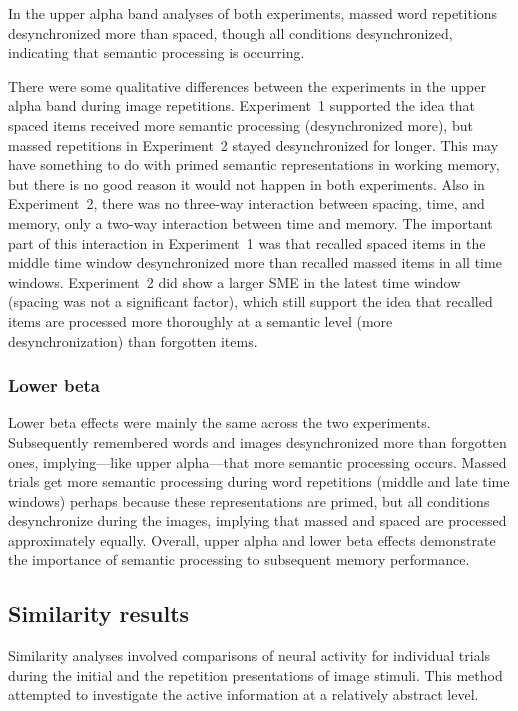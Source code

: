 In the upper alpha band analyses of both experiments, massed word repetitions desynchronized more than spaced, though all conditions desynchronized, indicating that semantic processing is occurring.

There were some qualitative differences between the experiments in the upper alpha band during image repetitions.  Experiment~1 supported the idea that spaced items received more semantic processing (desynchronized more), but massed repetitions in Experiment~2 stayed desynchronized for longer.  This may have something to do with primed semantic representations in working memory, but there is no good reason it would not happen in both experiments.  Also in Experiment~2, there was no three-way interaction between spacing, time, and memory, only a two-way interaction between time and memory.  The important part of this interaction in Experiment~1 was that recalled spaced items in the middle time window desynchronized more than recalled massed items in all time windows.  Experiment~2 did show a larger SME in the latest time window (spacing was not a significant factor), which still support the idea that recalled items are processed more thoroughly at a semantic level (more desynchronization) than forgotten items.



\subsubsection{Lower beta}

Lower beta effects were mainly the same across the two experiments.  Subsequently remembered words and images desynchronized more than forgotten ones, implying---like upper alpha---that more semantic processing occurs.
Massed trials get more semantic processing during word repetitions (middle and late time windows) perhaps because these representations are primed, but all conditions desynchronize during the images, implying that massed and spaced are processed approximately equally.  Overall, upper alpha and lower beta effects demonstrate the importance of semantic processing to subsequent memory performance.

\subsection{Similarity results}

Similarity analyses involved comparisons of neural activity for individual trials during the initial and the repetition presentations of image stimuli.  This method attempted to investigate the active information at a relatively abstract level.

